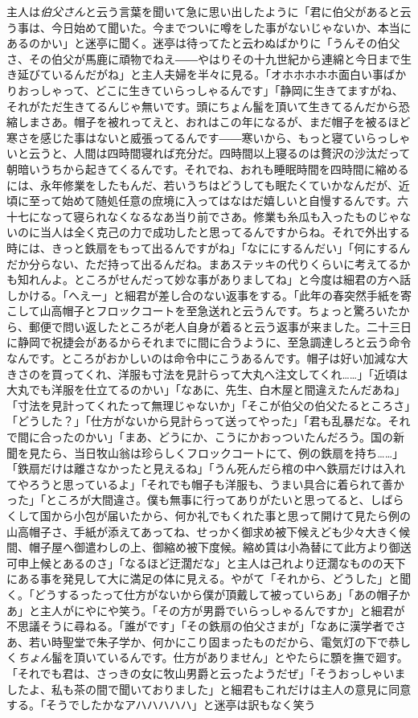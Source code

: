 \documentclass[12pt, openright]{book}
\begin{document}
主人は\emph{伯父さん}と云う言葉を聞いて急に思い出したように「君に伯父があると云う事は、今日始めて聞いた。今までついに噂をした事がないじゃないか、本当にあるのかい」と迷亭に聞く。迷亭は待ってたと云わぬばかりに「うんその伯父さ、その伯父が馬鹿に頑物でねえ――やはりその十九世紀から連綿と今日まで生き延びているんだがね」と主人夫婦を半々に見る。「オホホホホホ面白い事ばかりおっしゃって、どこに生きていらっしゃるんです」「静岡に生きてますがね、それがただ生きてるんじゃ無いです。頭にちょん髷を頂いて生きてるんだから恐縮しまさあ。帽子を被れってえと、おれはこの年になるが、まだ帽子を被るほど寒さを感じた事はないと威張ってるんです――寒いから、もっと寝ていらっしゃいと云うと、人間は四時間寝れば充分だ。四時間以上寝るのは贅沢の沙汰だって朝暗いうちから起きてくるんです。それでね、おれも睡眠時間を四時間に縮めるには、永年修業をしたもんだ、若いうちはどうしても眠たくていかなんだが、近頃に至って始めて随処任意の庶境に入ってはなはだ嬉しいと自慢するんです。六十七になって寝られなくなるなあ当り前でさあ。修業も糸瓜も入ったものじゃないのに当人は全く克己の力で成功したと思ってるんですからね。それで外出する時には、きっと鉄扇をもって出るんですがね」「なににするんだい」「何にするんだか分らない、ただ持って出るんだね。まあステッキの代りくらいに考えてるかも知れんよ。ところがせんだって妙な事がありましてね」と今度は細君の方へ話しかける。「へえー」と細君が差し合のない返事をする。「此年の春突然手紙を寄こして山高帽子とフロックコートを至急送れと云うんです。ちょっと驚ろいたから、郵便で問い返したところが老人自身が着ると云う返事が来ました。二十三日に静岡で祝捷会があるからそれまでに間に合うように、至急調達しろと云う命令なんです。ところがおかしいのは命令中にこうあるんです。帽子は好い加減な大きさのを買ってくれ、洋服も寸法を見計らって大丸へ注文してくれ\ldots{}\ldots{}」「近頃は大丸でも洋服を仕立てるのかい」「なあに、先生、白木屋と間違えたんだあね」「寸法を見計ってくれたって無理じゃないか」「そこが伯父の伯父たるところさ」「どうした？」「仕方がないから見計らって送ってやった」「君も乱暴だな。それで間に合ったのかい」「まあ、どうにか、こうにかおっついたんだろう。国の新聞を見たら、当日牧山翁は珍らしくフロックコートにて、例の鉄扇を持ち\ldots{}\ldots{}」「鉄扇だけは離さなかったと見えるね」「うん死んだら棺の中へ鉄扇だけは入れてやろうと思っているよ」「それでも帽子も洋服も、うまい具合に着られて善かった」「ところが大間違さ。僕も無事に行ってありがたいと思ってると、しばらくして国から小包が届いたから、何か礼でもくれた事と思って開けて見たら例の山高帽子さ、手紙が添えてあってね、せっかく御求め被下候えども少々大きく候間、帽子屋へ御遣わしの上、御縮め被下度候。縮め賃は小為替にて此方より御送可申上候とあるのさ」「なるほど迂濶だな」と主人は己れより迂濶なものの天下にある事を発見して大に満足の体に見える。やがて「それから、どうした」と聞く。「どうするったって仕方がないから僕が頂戴して被っていらあ」「あの帽子かあ」と主人がにやにや笑う。「その方が男爵でいらっしゃるんですか」と細君が不思議そうに尋ねる。「誰がです」「その鉄扇の伯父さまが」「なあに漢学者でさあ、若い時聖堂で朱子学か、何かにこり固まったものだから、電気灯の下で恭しく\emph{ちょん}髷を頂いているんです。仕方がありません」とやたらに顋を撫で廻す。「それでも君は、さっきの女に牧山男爵と云ったようだぜ」「そうおっしゃいましたよ、私も茶の間で聞いておりました」と細君もこれだけは主人の意見に同意する。「そうでしたかなアハハハハハ」と迷亭は訳もなく笑う
\end{document}
